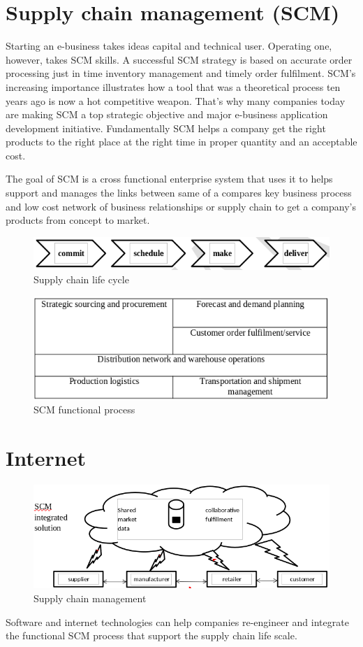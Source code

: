 \documentclass[twocolumn, 12pt, a4paper]{article}
\begin{document}
\section{Supply chain management (SCM)}
Starting an e-business takes ideas capital and technical user. Operating one, however, takes SCM skills. A successful SCM strategy is based on accurate order processing just in time inventory management and timely order fulfilment. SCM’s increasing importance illustrates how a tool that was a theoretical process ten years ago is now a hot competitive weapon. That’s why many companies today are making SCM a top strategic objective and major e-business application development initiative. Fundamentally SCM helps a company get the right products to the right place at the right time in proper quantity and an acceptable cost.

The goal of SCM is a cross functional enterprise system that uses it to helps support and manages the links between same of a compares key business process and low cost network of business relationships or supply chain to get a company’s products from concept to market.

\begin{figure}[ht]
  \includegraphics[width=\columnwidth]{scmlc}
  \caption{Supply chain life cycle}
\end{figure}

\begin{figure}[ht]
  \includegraphics[width=\columnwidth]{scmfuncproc}
  \caption{SCM functional process}
\end{figure}


\section{Internet}
\begin{figure}[ht]
  \includegraphics[width=\columnwidth]{scminter}
  \caption{Supply chain management}
\end{figure}
Software and internet technologies can help companies re-engineer and integrate the functional SCM process that support the supply chain life scale.
\end{document}
